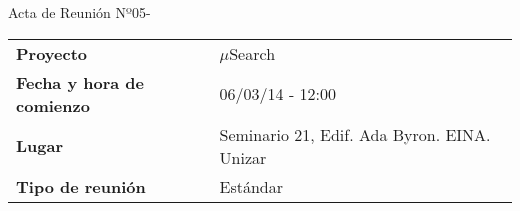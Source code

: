 \begin{center}	
\Large{Acta de Reunión Nº05\hspace{0.25em}-\hspace{0.25em}\tituloReunion}
\end{center}
\vspace{0.8em}

\begin{longtable}{ | L{\tabcolsep} |
				     L{\tabcolsep} | }
\hline %
  \\
\hline %
{\bf Proyecto} & $\mu$Search \\ 
\hline %
{\bf Fecha y hora de comienzo} & 06/03/14 - 12:00 \\
\hline %
{\bf Lugar} & Seminario 21, Edif. Ada Byron. EINA. Unizar \\
\hline %
{\bf Tipo de reunión} & Estándar \\
\hline %
\end{longtable}


